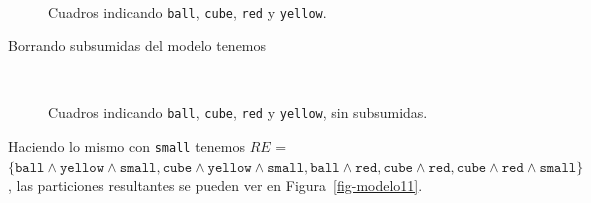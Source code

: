 \begin{figure}[ht]
\begin{center}
\\[0pt]
\caption{Cuadros indicando \texttt{ball}, \texttt{cube}, \texttt{red} y \texttt{yellow}.}
\label{fig-modelo10}
\end{center}
\end{figure}

Borrando subsumidas del modelo tenemos
\begin{figure}[ht]
\begin{center}
\\[0pt]
\caption{Cuadros indicando \texttt{ball}, \texttt{cube}, \texttt{red} y \texttt{yellow}, sin subsumidas.}
\label{fig-modelo10}
\end{center}
\end{figure}

Haciendo lo mismo con \texttt{small} tenemos $RE$ = $\{\texttt{ball} \wedge \texttt{yellow} \wedge \texttt{small}, \texttt{cube} \wedge \texttt{yellow} \wedge \texttt{small}, \texttt{ball} \wedge \texttt{red}, \texttt{cube} \wedge \texttt{red}, \texttt{cube} \wedge \texttt{red} \wedge \texttt{small}\}$, las particiones resultantes se pueden ver en Figura~\ref{fig-modelo11}.

%

